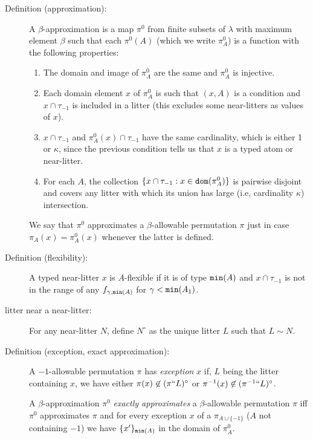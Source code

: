 \documentclass[112pt]{article}
\begin{document}
\begin{description}
\item[Definition (approximation):]   A $\beta$-approximation is a map $\pi^0$ from finite subsets of $\lambda$ with maximum element $\beta$ such
that each $\pi^0(A)$ (which we write $\pi^0_A$) is a function with the following properties:

\begin{enumerate}

\item  The domain and image of $\pi^0_A$ are the same and $\pi^0_A$ is injective.

\item Each domain element $x$ of $\pi^0_A$ is such that $(x,A)$ is a condition and $x \cap \tau_{-1}$ is included in a litter (this excludes some near-litters as values of $x$).

\item $x \cap \tau_{-1}$ and $\pi^0_A(x) \cap \tau_{-1}$ have the same cardinality, which is either 1 or $\kappa$, since the previous condition tells us that $x$ is a typed atom or near-litter.

\item  For each $A$, the collection $\{x \cap \tau_{-1}: x \in {\tt dom}(\pi^0_A)\}$ is pairwise disjoint  and covers any litter with which its union has large (i.e, cardinality $\kappa$)  intersection.

\end{enumerate}

We say that $\pi^0$ approximates a $\beta$-allowable permutation $\pi$ just in case $\pi_A(x) = \pi^0_A(x)$ whenever the latter is defined.

\item[Definition (flexibility):]  A typed near-litter $x$ is $A$-flexible if it is of type ${\tt min}(A)$ and $x \cap \tau_{-1}$ is not in the range of any $f_{\gamma,{\tt min}(A)}$
for $\gamma<{\tt min}(A_1)$.

\item[litter near a near-litter:]  For any near-litter $N$, define $N^\circ$ as the unique litter $L$ such that $L \sim N$.

\item[Definition (exception, exact approximation):]  A $-1$-allowable permutation $\pi$ has {\em exception\/} $x$ if, $L$ being the litter containing $x$,
we have either $\pi(x) \not\in (\pi``L)^\circ$ or $\pi^{-1}(x) \not\in (\pi^{-1}``L)^\circ$.

A $\beta$-approximation $\pi^0$ {\em exactly approximates\/} a $\beta$-allowable permutation $\pi$ iff $\pi^0$ approximates $\pi$ and
for every exception $x$ of a $\pi_{A \cup \{-1\}}$ ($A$ not containing $-1$) we have $\{x'\}_{{\tt min}(A)}$ in the domain of $\pi^0_A$.


\end{description}
\end{document}
